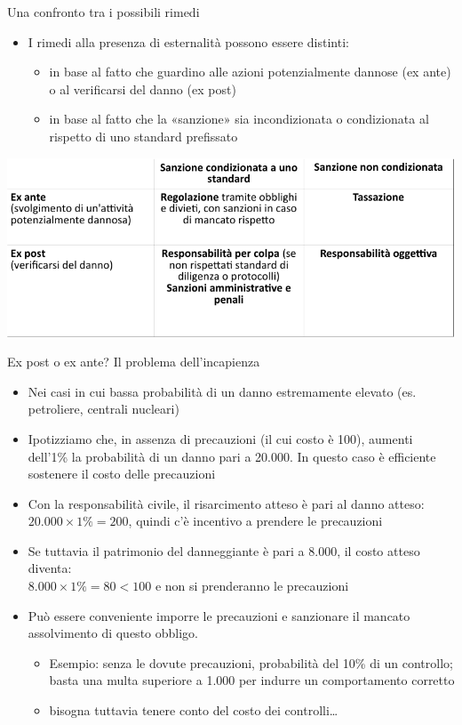 \documentclass[aspectratio=64,12pt]{beamer}
\begin{document}
\begin{frame}{Una confronto tra i possibili rimedi}
\begin{itemize}
\item I rimedi alla presenza di esternalità possono essere distinti:
\begin{itemize}
\item in base al fatto che guardino alle azioni potenzialmente dannose (ex ante) o
al verificarsi del danno (ex post)
\item in base al fatto che la «sanzione» sia incondizionata o condizionata al
rispetto di uno standard prefissato
\end{itemize}
\end{itemize}

\begin{center}
\includegraphics[width=.9\linewidth]{./figure/esternalita-comparazione-rimedi.pdf}
\end{center}
\end{frame}


\begin{frame}{Ex post o ex ante? Il problema dell'incapienza}
\begin{itemize}
\item Nei casi in cui bassa probabilità di un danno estremamente elevato (es. petroliere, centrali nucleari)
\item Ipotizziamo che, in assenza di precauzioni (il cui costo è 100), aumenti dell'1\% la probabilità di un danno pari a 20.000. In questo caso è efficiente sostenere il costo delle precauzioni
\item Con la responsabilità civile, il risarcimento atteso è pari al danno atteso:\\[0pt]
$20.000 \times 1\% = 200$, quindi c'è incentivo a prendere le precauzioni
\item Se tuttavia il patrimonio del danneggiante è pari a 8.000, il costo atteso
diventa:\\[0pt]
$8.000 \times 1\% = 80 < 100$ e non si prenderanno le precauzioni
\item Può essere conveniente imporre le precauzioni e sanzionare il mancato
assolvimento di questo obbligo.
\begin{itemize}
\item Esempio: senza le dovute precauzioni, probabilità del 10\% di un controllo;
basta una multa superiore a 1.000 per indurre un comportamento corretto
\item bisogna tuttavia tenere conto del costo dei controlli\ldots{}
\end{itemize}
\end{itemize}
\end{frame}
\end{document}
